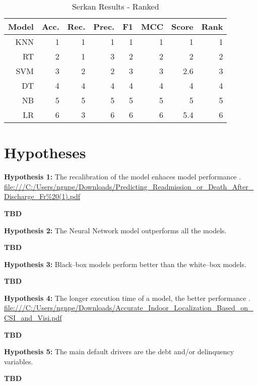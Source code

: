 \begin{table}[H]
    \small
    \setlength{\tabcolsep}{8pt}
    \renewcommand{\arraystretch}{1.3}
    \centering
    \caption[Serkan Results - Ranked]{Serkan Results - Ranked}\label{tab:serkanresultsranks}
    \begin{tabular}{r r r r r r r r}
    \toprule
    Model & Acc. & Rec. & Prec. & F1 & MCC & Score & Rank \\
    \midrule
    \hline
	
    KNN & 1 & 1 & 1 & 1 & 1 & 1 & 1 \\ 
    RT & 2 & 1 & 3 & 2 & 2 & 2 & 2 \\ 
    SVM & 3 & 2 & 2 & 3 & 3 & 2.6 & 3 \\ 
    DT & 4 & 4 & 4 & 4 & 4 & 4 & 4 \\ 
    NB & 5 & 5 & 5 & 5 & 5 & 5 & 5 \\ 
    LR & 6 & 3 & 6 & 6 & 6 & 5.4 & 6 \\ 
	
    \hline
    \bottomrule
    \end{tabular}
    \vspace{0.35em}
    
    \vspace{-1em}
\end{table}



\section{Hypotheses}

\noindent \textbf{Hypothesis 1:} The recalibration of the model enhaces model performance \citep{de2023predicting}.
\url{file:///C:/Users/ngnpe/Downloads/Predicting_Readmission_or_Death_After_Discharge_Fr%20(1).pdf}

\textbf{TBD}

\noindent \textbf{Hypothesis 2:} The Neural Network model outperforms all the models.

\textbf{TBD}

\noindent \textbf{Hypothesis 3:} Black--box models perform better than the white--box models.

\textbf{TBD}

\noindent \textbf{Hypothesis 4:} The longer execution time of a model, the better performance \citep{wu2018accurate}.
\url{file:///C:/Users/ngnpe/Downloads/Accurate_Indoor_Localization_Based_on_CSI_and_Visi.pdf}

\textbf{TBD}

\noindent \textbf{Hypothesis 5:} The main default drivers are the debt and/or delinquency variables.

\textbf{TBD}